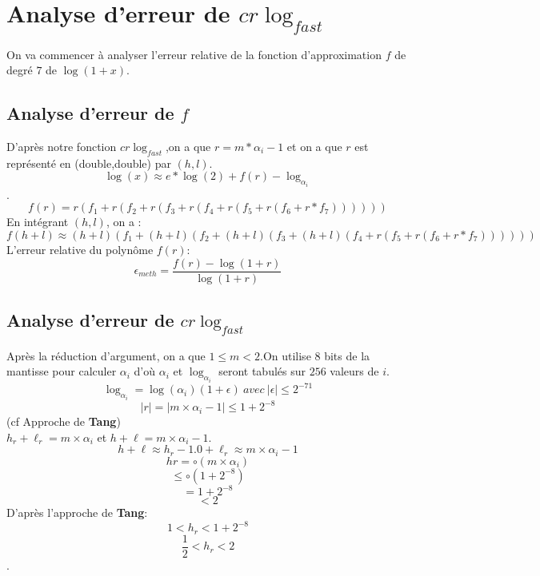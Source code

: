 \section{Analyse d'erreur de $cr\log_{fast}$}

On va commencer à analyser l'erreur relative de la fonction d'approximation $f$ de degré $7$ de $\log(1+x)$.\\
\subsection{Analyse d'erreur de $f$}
D'après notre fonction $cr\log_{fast}$,on a que $r = m*\alpha_i-1$ et on a que $r$ est représenté en (double,double) par $(h,l)$.\\ 
$$\log(x) \approx e*\log(2)+f(r)-\log_{\alpha_i}$$.
$$f(r) = r(f_1+r(f_2+r(f_3+r(f_4+r(f_5+r(f_6+r*f_7))))))$$
En intégrant $(h,l)$, on a :
$$f(h+l) \approx (h+l)(f_1+(h+l)(f_2+(h+l)(f_3+(h+l)(f_4+r(f_5+r(f_6+r*f_7))))))$$
L'erreur relative du polynôme $f(r)$:\\
$$\epsilon_{meth} = \frac{f(r)-\log(1+r)}{\log(1+r)}$$

\subsection{Analyse d'erreur de $cr\log_{fast}$}

Après la réduction d'argument, on a que $1\leq m < 2$.On utilise $8$ bits de la mantisse pour calculer $\alpha_i$ d'où $\alpha_i$ et $\log_{\alpha_i}$ seront tabulés sur $256$ valeurs de $i$.\\
$$\log_{\alpha_i} = \log(\alpha_i)(1+\epsilon)\ avec \ |\epsilon| \le 2^{-71}$$
$$|r| = |m\times \alpha_i-1| \le 1 + 2^{-8}$$(cf Approche de \textbf{Tang})\\
$h_r+{\ell}_r=m\times \alpha_i$ et $h+{\ell} = m\times \alpha_i-1$.
$$h+{\ell} \approx h_r- 1.0 +{\ell}_r  \approx m\times \alpha_i-1$$
$$hr = \circ (m\times \alpha_i)$$
$$  \le \circ (1+2^{-8})$$
$$= 1+2^{-8}$$
$$ < 2$$
D'après l'approche de \textbf{Tang}:\\
$$1<h_r<1+2^{-8}$$
$$\frac{1}{2}<h_r<2$$.\\

